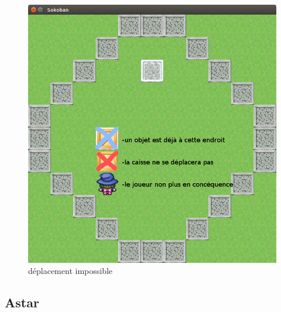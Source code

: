\documentclass{article}
\begin{document}
\begin{figure}
\begin{center}
\begin{minipage}[b]{0.4\textwidth}
    \includegraphics[width=\textwidth]{../Screenshots/04.png}
    \caption{déplacement impossible}
  \end{minipage}
				
				
							
	\end{center}
	\end{figure}	
		
		
		
		
			
	\newpage
		\subsection{Astar}
		
		\newpage
\end{document}
